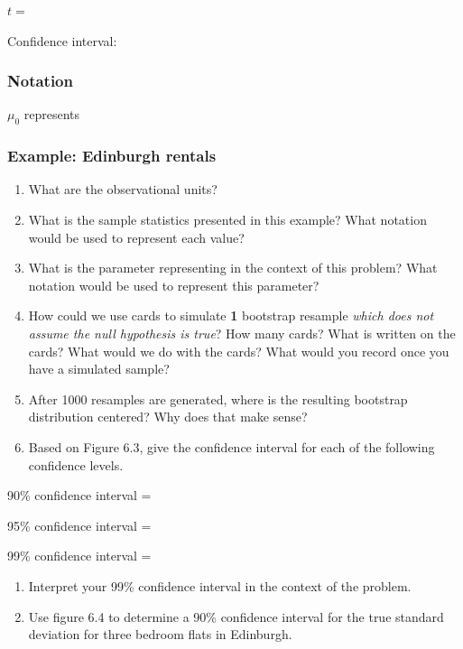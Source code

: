 \documentclass[
]{report}
\newcommand{\rgs}{\vspace{12pt}} %
\newcommand{\rgi}{\hspace{24pt}}  %
\begin{document}
\(t=\)
\rgs 

Confidence interval:
\rgs 

\hypertarget{notation-1}{%
\subsubsection*{Notation}\label{notation-1}}

\(\mu_0\) represents
\rgs 

\hypertarget{example-edinburgh-rentals}{%
\subsubsection*{Example: Edinburgh rentals}\label{example-edinburgh-rentals}}

\begin{enumerate}
\def\labelenumi{\arabic{enumi}.}
\item
  What are the observational units?
  \rgs 
\item
  What is the sample statistics presented in this example? What notation would be used to represent each value?
  \rgs 
\item
  What is the parameter representing in the context of this problem? What notation would be used to represent this parameter?
  \rgs 
  \rgs 
\item
  How could we use cards to simulate \textbf{1} bootstrap resample \emph{which does not assume the null hypothesis is true}? How many cards? What is written on the cards? What would we do with the cards? What would you record once you have a simulated sample?
  \rgs 
  \rgs 
\item
  After 1000 resamples are generated, where is the resulting bootstrap distribution centered? Why does that make sense?
  \rgs 
  \rgs 
\item
  Based on Figure 6.3, give the confidence interval for each of the following confidence levels.
\end{enumerate}

\rgi 90\% confidence interval =
\rgs 

\rgi 95\% confidence interval =
\rgs 

\rgi 99\% confidence interval =
\rgs 

\begin{enumerate}
\def\labelenumi{\arabic{enumi}.}
\setcounter{enumi}{6}
\item
  Interpret your 99\% confidence interval in the context of the problem.
  \rgs 
  \rgs 
\item
  Use figure 6.4 to determine a 90\% confidence interval for the true standard deviation for three bedroom flats in Edinburgh.
  \rgs 
\end{enumerate}
\end{document}
